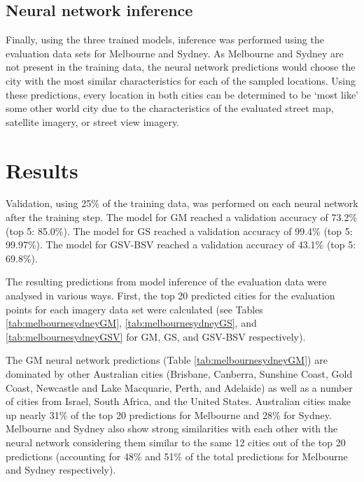 \documentclass[10pt,letterpaper,hidelinks]{article}
\begin{document}
\subsection*{Neural network inference}\label{sec:methods5}    
Finally, using the three trained models, inference was performed using the evaluation data sets for Melbourne and Sydney. As Melbourne and Sydney are not present in the training data, the neural network predictions would choose the city with the most similar characteristics for each of the sampled locations. Using these predictions, every location in both cities can be determined to be `most like' some other world city due to the characteristics of the evaluated street map, satellite imagery, or street view imagery.

\section*{Results}\label{sec:results}

Validation, using 25\% of the training data, was performed on each neural network after the training step. The model for GM reached a validation accuracy of 73.2\% (top 5: 85.0\%). The model for GS reached a validation accuracy of 99.4\% (top 5: 99.97\%). The model for GSV-BSV reached a validation accuracy of 43.1\% (top 5: 69.8\%).

The resulting predictions from model inference of the evaluation data were analysed in various ways. First, the top 20 predicted cities for the evaluation points for each imagery data set were calculated (see Tables \ref{tab:melbournesydneyGM}, \ref{tab:melbournesydneyGS}, and \ref{tab:melbournesydneyGSV} for GM, GS, and GSV-BSV respectively).

The GM neural network predictions (Table \ref{tab:melbournesydneyGM}) are dominated by other Australian cities (Brisbane, Canberra, Sunshine Coast, Gold Coast, Newcastle and Lake Macquarie, Perth, and Adelaide) as well as a number of cities from Israel, South Africa, and the United States. Australian cities make up nearly 31\% of the top 20 predictions for Melbourne and 28\% for Sydney. Melbourne and Sydney also show strong similarities with each other with the neural network considering them similar to the same 12 cities out of the top 20 predictions (accounting for 48\% and 51\% of the total predictions for Melbourne and Sydney respectively).
\end{document}
